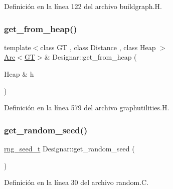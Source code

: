 Definición en la línea 122 del archivo buildgraph.\+H.

\mbox{\label{namespace_designar_a6f1ec5f4fb17e9a3c3a6b02f724764f6}} 
\subsubsection{\texorpdfstring{get\+\_\+from\+\_\+heap()}{get\_from\_heap()}}
{\footnotesize\ttfamily template$<$class GT , class Distance , class Heap $>$ \\
\hyperlink{namespace_designar_a3f55fb5513d62ff47cbc8f72b8e95d6f}{Arc}$<$\hyperlink{demo-buildgraph_8_c_a3001c40d2c31ca87ed96cd7d1334a55e}{GT}$>$\& Designar\+::get\+\_\+from\+\_\+heap (\begin{DoxyParamCaption}\item[{Heap \&}]{h }\end{DoxyParamCaption})}



Definición en la línea 579 del archivo graphutilities.\+H.

\mbox{\label{namespace_designar_a39f540907bf568cf8e9983cffbc5246c}} 
\subsubsection{\texorpdfstring{get\+\_\+random\+\_\+seed()}{get\_random\_seed()}}
{\footnotesize\ttfamily \hyperlink{namespace_designar_ad621b5646d45288c5d6a1e1dfe7531a8}{rng\+\_\+seed\+\_\+t} Designar\+::get\+\_\+random\+\_\+seed (\begin{DoxyParamCaption}{ }\end{DoxyParamCaption})}



Definición en la línea 30 del archivo random.\+C.

\mbox{\label{namespace_designar_a279a11030cf78659ddbdec00473f0365}} 
